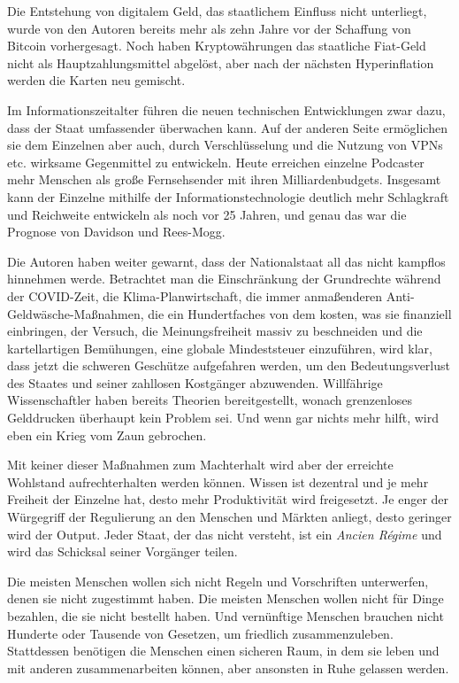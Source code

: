 \documentclass[
  a5paper,
  smalldemyvopaper,10pt,twoside,onecolumn,openright,extrafontsizes,hidelinks]{memoir}
\begin{document}
Die Entstehung von digitalem Geld, das staatlichem Einfluss nicht
unterliegt, wurde von den Autoren bereits mehr als zehn Jahre vor der
Schaffung von Bitcoin vorhergesagt. Noch haben Kryptowährungen das
staatliche Fiat-Geld nicht als Hauptzahlungsmittel abgelöst, aber nach
der nächsten Hyperinflation werden die Karten neu gemischt.

Im Informationszeitalter führen die neuen technischen Entwicklungen zwar
dazu, dass der Staat umfassender überwachen kann. Auf der anderen Seite
ermöglichen sie dem Einzelnen aber auch, durch Verschlüsselung und die
Nutzung von VPNs etc. wirksame Gegenmittel zu entwickeln. Heute
erreichen einzelne Podcaster mehr Menschen als große Fernsehsender mit
ihren Milliardenbudgets. Insgesamt kann der Einzelne mithilfe der
Informationstechnologie deutlich mehr Schlagkraft und Reichweite
entwickeln als noch vor 25 Jahren, und genau das war die Prognose von
Davidson und Rees-Mogg.

Die Autoren haben weiter gewarnt, dass der Nationalstaat all das nicht
kampflos hinnehmen werde. Betrachtet man die Einschränkung der
Grundrechte während der COVID-Zeit, die Klima-Planwirtschaft, die immer
anmaßenderen Anti-Geldwäsche-Maßnahmen, die ein Hundertfaches von dem
kosten, was sie finanziell einbringen, der Versuch, die Meinungsfreiheit
massiv zu beschneiden und die kartellartigen Bemühungen, eine globale
Mindeststeuer einzuführen, wird klar, dass jetzt die schweren Geschütze
aufgefahren werden, um den Bedeutungsverlust des Staates und seiner
zahllosen Kostgänger abzuwenden. Willfährige Wissenschaftler haben
bereits Theorien bereitgestellt, wonach grenzenloses Gelddrucken
überhaupt kein Problem sei. Und wenn gar nichts mehr hilft, wird eben
ein Krieg vom Zaun gebrochen.

Mit keiner dieser Maßnahmen zum Machterhalt wird aber der erreichte
Wohlstand aufrechterhalten werden können. Wissen ist dezentral und je
mehr Freiheit der Einzelne hat, desto mehr Produktivität wird
freigesetzt. Je enger der Würgegriff der Regulierung an den Menschen und
Märkten anliegt, desto geringer wird der Output. Jeder Staat, der das
nicht versteht, ist ein \emph{Ancien Régime} und wird das Schicksal
seiner Vorgänger teilen.

Die meisten Menschen wollen sich nicht Regeln und Vorschriften
unterwerfen, denen sie nicht zugestimmt haben. Die meisten Menschen
wollen nicht für Dinge bezahlen, die sie nicht bestellt haben. Und
vernünftige Menschen brauchen nicht Hunderte oder Tausende von Gesetzen,
um friedlich zusammenzuleben. Stattdessen benötigen die Menschen einen
sicheren Raum, in dem sie leben und mit anderen zusammenarbeiten können,
aber ansonsten in Ruhe gelassen werden.
\end{document}
